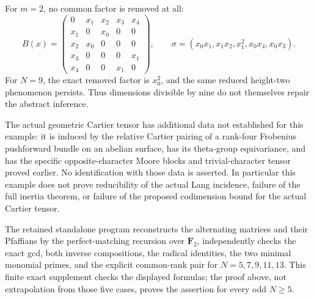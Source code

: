 \begin{remark}
\label{rem:abstract-Pfaffian-height-two-scope}
For \(m=2\), no common factor is removed at all:
\[
 B(x)=
 \begin{pmatrix}
 0&x_1&x_2&x_3&x_4\\
 x_1&0&x_0&0&0\\
 x_2&x_0&0&0&0\\
 x_3&0&0&0&x_1\\
 x_4&0&0&x_1&0
 \end{pmatrix},\qquad
 \sigma=(x_0x_1,x_1x_2,x_1^2,x_0x_4,x_0x_3).                    \tag{PH2.9}
\]
For \(N=9\), the exact removed factor is \(x_0^2\), and the
same reduced height-two phenomenon persists.  Thus dimensions
divisible by nine do not themselves repair the abstract inference.

The actual geometric Cartier tensor has additional data not
established for this example: it is induced by the relative Cartier
pairing of a rank-four Frobenius pushforward bundle on an abelian
surface, has its theta-group equivariance, and has the specific
opposite-character Moore blocks and trivial-character tensor proved
earlier.  No identification with those data is asserted.
In particular this example does not prove reducibility of the actual
Lang incidence, failure of the full inertia theorem, or failure of
the proposed codimension bound for the actual Cartier tensor.

The retained standalone program
reconstructs the alternating matrices and their Pfaffians by the
perfect-matching recursion over \(\mathbf F_2\), independently checks
the exact gcd, both inverse compositions, the radical identities,
the two minimal monomial primes, and the explicit common-rank pair
for \(N=5,7,9,11,13\).  This finite exact supplement checks the
displayed formulas; the proof above, not extrapolation from those
five cases, proves the assertion for every odd \(N\ge5\).
\end{remark}

